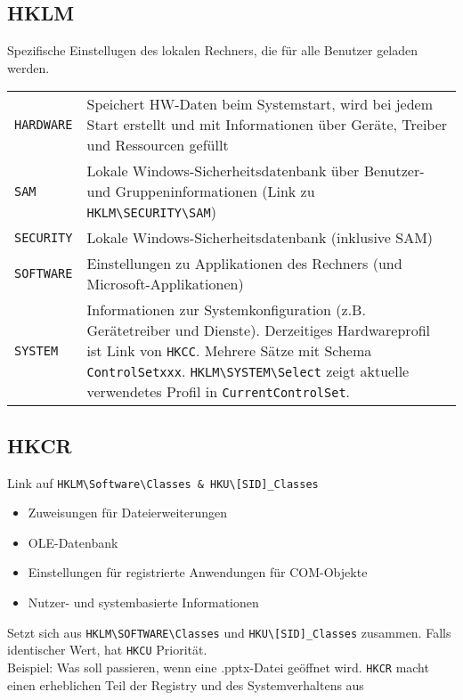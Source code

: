 \subsection{HKLM}
Spezifische Einstellugen des lokalen Rechners, die für alle Benutzer geladen werden.
\settowidth{\MyLen}{HLKM.folder.}
\begin{tabular}{@{}p{\the\MyLen}%
		@{}p{\linewidth-\the\MyLen}@{}}
	\texttt{HARDWARE} & Speichert HW-Daten beim Systemstart, wird bei jedem Start erstellt und mit Informationen über Geräte, Treiber und Ressourcen gefüllt\\
	\texttt{SAM} & Lokale Windows-Sicherheitsdatenbank über Benutzer- und Gruppeninformationen (Link zu \texttt{HKLM\textbackslash SECURITY\textbackslash SAM})\\
	\texttt{SECURITY} & Lokale Windows-Sicherheitsdatenbank (inklusive SAM)\\
	\texttt{SOFTWARE} & Einstellungen zu Applikationen des Rechners (und Microsoft-Applikationen)\\
	\texttt{SYSTEM} & Informationen zur Systemkonfiguration (z.B. Gerätetreiber und Dienste). Derzeitiges Hardwareprofil ist Link von \texttt{HKCC}. Mehrere Sätze mit Schema \texttt{ControlSetxxx}. \texttt{HKLM\textbackslash SYSTEM\textbackslash Select} zeigt aktuelle verwendetes Profil in \texttt{CurrentControlSet}.
\end{tabular}

\subsection{HKCR}
Link auf \texttt{HKLM\textbackslash Software\textbackslash Classes \& HKU\textbackslash [SID]\_Classes}
\begin{itemize}[leftmargin=*]
	\item Zuweisungen für Dateierweiterungen
	\item OLE-Datenbank
	\item Einstellungen für registrierte Anwendungen für COM-Objekte
	\item Nutzer- und systembasierte Informationen
\end{itemize}
Setzt sich aus \texttt{HKLM\textbackslash SOFTWARE\textbackslash Classes} und \texttt{HKU\textbackslash [SID]\_Classes} zusammen. Falls identischer Wert, hat \texttt{HKCU} Priorität.\\
Beispiel: Was soll passieren, wenn eine .pptx-Datei geöffnet wird. \texttt{HKCR} macht einen erheblichen Teil der Registry und des Systemverhaltens aus

